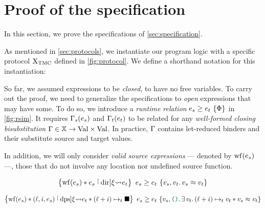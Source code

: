 \section{Proof of the specification}
\label{sec:proof}

In this section, we prove the specifications of \cref{sec:specification}.

As mentioned in \cref{sec:protocols}, we instantiate our program logic with a specific protocol $\mathrm{X}_\mathrm{TMC}$ defined in \cref{fig:protocol}. We define a shorthand notation for this instantiation:
\begin{mathline}
    \coloneqq
\end{mathline}

So far, we assumed expressions to be \emph{closed}, \ie to have no free variables.
To carry out the proof, we need to generalize the specifications to \emph{open} expressions that may have some.
To do so, we introduce a \emph{runtime relation} $\iRsimv{\iPred}{\datalangExpr_s}{\datalangExpr_t}$ in \cref{fig:rsim}.
It requires $\datalangBisubst_s (\datalangExpr_s)$ and $\datalangBisubst_t (\datalangExpr_t)$ to be related for any \emph{well-formed closing bisubstitution} $\datalangBisubst \in \datalangVar[] \rightarrow \datalangVal[] \times \datalangVal[]$.
In practice, $\datalangBisubst$ contains let-reduced binders and their substitute source and target values.

In addition, we will only consider \emph{valid source expressions} --- denoted by $\wf{\datalangExpr_s}$ ---, \ie those that do not involve any location nor undefined source function.

\begin{lemma} \label{thm:dir}
    \[
        \iRsimvHoare{
            \wf{\datalangExpr_s} \iSep
            \datalangExpr_s \tmcDir{\datalangRenaming} \datalangExpr_t
        }{
            \datalangVal_s, \datalangVal_t \ldotp
            \datalangVal_s \iSimilar \datalangVal_t
        }{
            \datalangExpr_s
        }{
            \datalangExpr_t
        }
    \]
\end{lemma}

\begin{lemma} \label{thm:dps}
    \[
        \iRsimvHoare{
            \wf{\datalangExpr_s} \iSep
            (\datalangLoc, \datalangIdx, \datalangExpr_s) \tmcDps{\datalangRenaming} \datalangExpr_t \iSep
            (\datalangLoc + \datalangIdx) \iPointsto_t \datalangHole
        }{
            \datalangVal_s, \datalangUnit \ldotp
            \exists \datalangVal_t \ldotp
            (\datalangLoc + \datalangIdx) \iPointsto_t \datalangVal_t \iSep
            \datalangVal_s \iSimilar \datalangVal_t
        }{
            \datalangExpr_s
        }{
            \datalangExpr_t
        }
    \]
\end{lemma}

